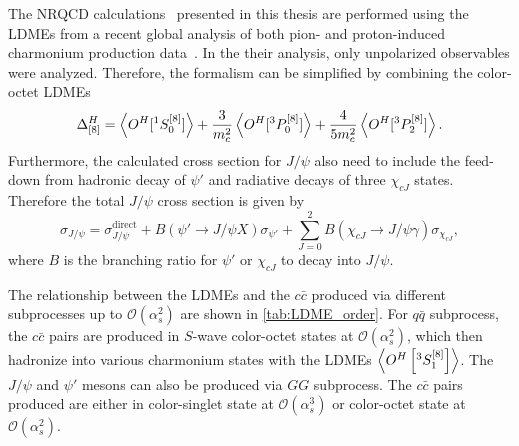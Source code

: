 \documentclass[../main.tex]{subfiles}
\begin{document}
The NRQCD calculations~\cite{chang2023a} presented in this thesis are performed using the LDMEs
from a recent global analysis of both pion- and proton-induced charmonium production data~\cite{chang2023}.
In the their analysis, only unpolarized observables were analyzed.
Therefore, the formalism can be simplified by combining the color-octet LDMEs
\begin{equation}
	\Delta^H_{[8]}=\expval{O^H[^1S_0^{\left[8\right]}]}+\frac{3}{m_c^2}\expval{O^H[^3P_0^{\left[8\right]}]}+\frac{4}{5m_c^2}\expval{O^H[^3P_2^{\left[8\right]}]}.
\end{equation}
Furthermore, the calculated cross section for $J/\psi$ also need to include the feed-down from hadronic decay
of $\psi'$ and radiative decays of three $\chi_{cJ}$ states.
Therefore the total $J/\psi$ cross section is given by
\begin{equation}
	\sigma_{J/\psi}=\sigma_{J/\psi}^{\mathrm{direct}}+B\left(\psi'\to J/\psi X\right)\sigma_{\psi'} +\sum_{J=0}^2 B\left(\chi_{cJ}\to J/\psi\gamma\right) \sigma_{\chi_{cJ}},
\end{equation}
where $B$ is the branching ratio for $\psi'$ or $\chi_{cJ}$ to decay into $J/\psi$.

The relationship between the LDMEs and the $c\bar{c}$ produced via different
subprocesses up to $\mathcal{O}\left(\alpha_s^2\right)$ are shown in \cref{tab:LDME_order}.
For $q\bar{q}$ subprocess, the $c\bar{c}$ pairs are produced in
$S$-wave color-octet states at $\mathcal{O}\left(\alpha_s^2\right)$,
which then hadronize into various charmonium states with the LDMEs $\expval{O^H\left[^3 S_1^{[8]}\right]}$.
The $J/\psi$ and $\psi'$ mesons can also be produced via $GG$ subprocess.
The $c\bar{c}$ pairs produced are either in color-singlet
state at $\mathcal{O}\left(\alpha_s^3\right)$ or color-octet state at $\mathcal{O}\left(\alpha_s^2\right)$.
\end{document}
